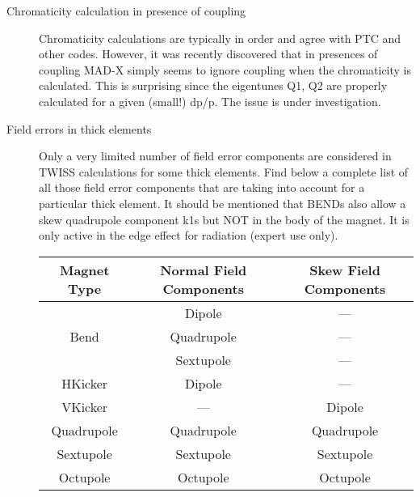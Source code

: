 \begin{description}
	\item[Chromaticity calculation in presence of coupling] 

     Chromaticity calculations are typically in order and agree with     PTC and other codes. However, it was recently discovered that in     presences of coupling MAD-X simply seems to ignore coupling when     the chromaticity is calculated. This is surprising since the     eigentunes Q1, Q2 are properly calculated for a given (small!)     dp/p. The issue is under investigation. 
\end{description}
\begin{description}
	\item[Field errors in thick elements] 

          Only a very limited number of field error components are          considered in TWISS calculations for some thick          elements. Find below a complete list of all those field error           components that are taking into account for a particular          thick element. It should be mentioned that BENDs also allow a          skew quadrupole component k1s but NOT in the body of the          magnet. It is only active in the edge effect for radiation          (expert use only).


{
\renewcommand{\arraystretch}{2}
\begin{tabular}{c | c | c}
\hline 
\textbf{Magnet Type} & \textbf{Normal Field Components} & \textbf{Skew Field Components} \\ 
\hline
 & Dipole & ---\\
Bend & Quadrupole & ---\\
 & Sextupole & ---\\
\hline
HKicker & Dipole & ---\\
\hline
VKicker & --- & Dipole\\
\hline
Quadrupole & Quadrupole & Quadrupole \\
\hline
Sextupole & Sextupole & Sextupole \\
\hline
Octupole & Octupole & Octupole \\
\hline
\end{tabular}
}
\end{description}
